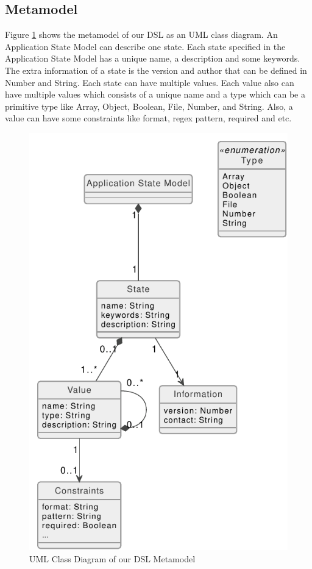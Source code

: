 \subsection{Metamodel}
Figure \ref{fig:asml-meta-model} shows the metamodel of our DSL as an UML class diagram. An Application State Model can describe one state. Each state specified in the Application State Model has a unique name, a description and some keywords. The extra information of a state is the version and author that can be defined in Number and String. Each state can have multiple values. Each value also can have multiple values which consists of a unique name and a type which can be a primitive type like Array, Object, Boolean, File, Number, and String. Also, a value can have some constraints like format, regex pattern, required and etc.

\FloatBarrier
\begin{figure}
    \includegraphics[scale=1]{../figures/asml-class-diagram.pdf}
    \centering
    \caption{UML Class Diagram of our DSL Metamodel}
    \label{fig:asml-meta-model}
\end{figure}
\FloatBarrier

